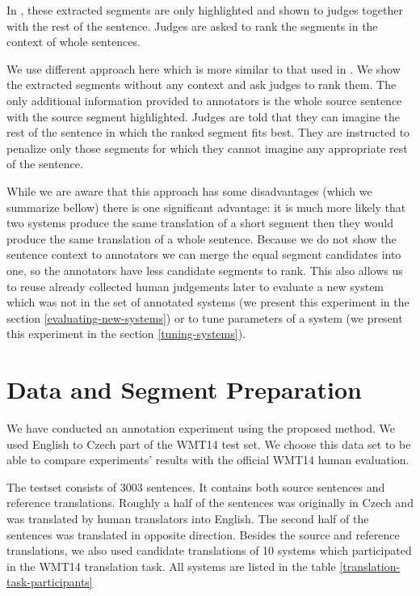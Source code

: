 In , these extracted segments are only highlighted and shown
to judges together with the rest of the sentence. Judges are asked to rank the
segments in the context of whole sentences. 

We use different approach here which is more similar to that used in
. We show the extracted segments without any context
and ask judges to rank them. The only additional information provided to
annotators is the whole source sentence with the source segment highlighted.
Judges are told that they can imagine the rest of the sentence in which the
ranked segment fits best. They are instructed to penalize only those segments
for which they cannot imagine any appropriate rest of the sentence.

While we are aware that this approach has some disadvantages (which we
summarize bellow) there is one significant advantage: it is much more likely
that two systems produce the same translation of a short segment then they
would produce the same translation of a whole sentence. Because we do not show
the sentence context to annotators we can merge the equal segment candidates
into one, so the annotators have less candidate segments to rank. This also
allows us to reuse already collected human judgements later to evaluate a new
system which was not in the set of annotated systems (we present this
experiment in the section \ref{evaluating-new-systems}) or to tune parameters
of a system (we present this experiment in the section \ref{tuning-systems}).

\section{Data and Segment Preparation}

We have conducted an annotation experiment using the proposed method. We used
English to Czech part of the WMT14  test set. We choose this data
set to be able to compare experiments' results with the official WMT14 human
evaluation. 

The testset consists of 3003  sentences. It contains both source
sentences and reference translations. Roughly a half of the sentences was
originally in Czech and was translated by human translators into English. The
second half of the sentences was translated in opposite direction. Besides the
source and reference translations, we also used candidate translations of 10
systems which participated in the WMT14 translation task. All systems are listed in 
the table \ref{translation-task-participants}


